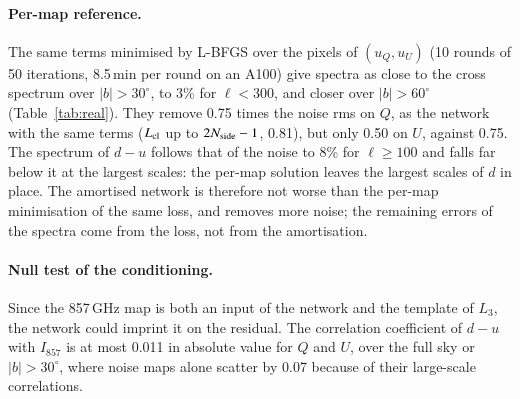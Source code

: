 \documentclass{aa}
\newcommand{\nside}{N_{\rm side}}
\begin{document}
\paragraph{Per-map reference.} The same terms minimised by L-BFGS over the pixels of $(u_Q,u_U)$ (10 rounds of 50 iterations, 8.5\,min per round on an A100) give spectra as close to the cross spectrum over $|b|>30^\circ$, to 3\% for $\ell<300$, and closer over $|b|>60^\circ$ (Table~\ref{tab:real}). They remove 0.75 times the noise rms on $Q$, as the network with the same terms ($L_{\rm cl}$ up to $2\nside-1$, 0.81), but only 0.50 on $U$, against 0.75. The spectrum of $d-u$ follows that of the noise to 8\% for $\ell\ge100$ and falls far below it at the largest scales: the per-map solution leaves the largest scales of $d$ in place. The amortised network is therefore not worse than the per-map minimisation of the same loss, and removes more noise; the remaining errors of the spectra come from the loss, not from the amortisation.

\paragraph{Null test of the conditioning.} Since the 857\,GHz map is both an input of the network and the template of $L_3$, the network could imprint it on the residual. The correlation coefficient of $d-u$ with $I_{857}$ is at most 0.011 in absolute value for $Q$ and $U$, over the full sky or $|b|>30^\circ$, where noise maps alone scatter by 0.07 because of their large-scale correlations.
\end{document}
